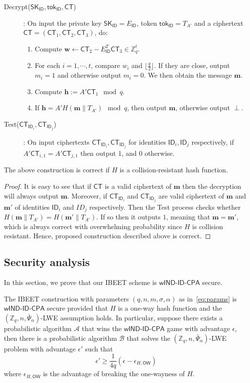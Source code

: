 \documentclass[runningheads]{llncs}
\def\ZZ{\mathbb{Z}}
\def\cal{\mathcal}
\def\bf{\mathbf}
\def\SK{\mathsf{SK}}
\def\tok{\mathsf{tok}}
\def\CT{\mathsf{CT}}
\def\wIND{\textsf{wIND-ID-CPA}}
\def\a{\alpha}
\def\ID{\mathsf{ID}}
\begin{document}
\begin{description}
		\item[Decrypt($\SK_\ID,\tok_\ID,\CT$)]: On input the private key $\SK_\ID=E_\ID$, token $\tok_\ID=T_{A'}$ and a ciphertext $\CT=(\CT_1,\CT_2,\CT_3)$, do:
		\begin{enumerate}
			\item Compute $\bf{w}\gets\CT_2-E_\ID^T\CT_3\in\ZZ_q^t$.
			\item For each $i=1,\cdots, t$, compare $w_i$ and $\lfloor\frac{q}{2}\rfloor$. If they are close, output $m_i=1$ and otherwise output $m_i=0$. We then obtain the message $\bf{m}$. 
			\item Compute $\bf{h}:=A'\CT_1\mod q$.
			\item If $\bf{h}=A'H(\bf{m}\|T_{A'})\mod q$, then output $\bf{m}$, otherwise output $\perp$.
		\end{enumerate}
		\item[Test($\CT_{\ID_i},\CT_{\ID_j}$)]: On input ciphertexts $\CT_{\ID_i},\CT_{\ID_j}$ for identities $\ID_i, \ID_j$ respectively, if $A'\CT_{i,1} = A'\CT_{j,1}$ then output 1, and $0$ otherwise.
	\end{description}
	
	
	\begin{theorem}\label{thm:correctness weak}
		The above construction is correct if $H$  is a collision-resistant hash function.
	\end{theorem}
\begin{proof}
	It is easy to see that if $\CT$ is a valid ciphertext of $\bf{m}$ then the decryption will always output $\bf{m}$. Moreover, if $\CT_{\ID_i}$ and $\CT_{\ID_j}$ are valid ciphertext of $\bf{m}$ and $\bf{m}'$ of identities $\ID_i$ and $ID_j$ respectively. Then the Test process checks whether $H(\bf{m}\|T_{A'})=H(\bf{m}'\|T_{A'})$. If so then it outputs $1$, meaning that $\bf{m}=\bf{m}'$, which is always correct with overwhelming probability since $H$ is collision resistant. Hence, proposed construction described above is correct.
\end{proof}

\subsection{Security analysis}
In this section, we prove that our IBEET scheme is $\wIND$ secure.
\begin{theorem}\label{thm: wIND}
	The IBEET construction with parameters $(q,n,m,\sigma,\alpha)$ as in~\eqref{eq:params}  is $\wIND$ secure provided that $H$ is a one-way hash function and the $(\ZZ_q,n,\bar\Psi_\a)$-LWE assumption holds. In particular, suppose there exists a probabilistic algorithm $\cal{A}$ that wins the $\wIND$ game with advantage $\epsilon$, then there is a probabilistic algorithm $\cal{B}$ that solves the $(\ZZ_q,n,\bar\Psi_\a)$-LWE problem with advantage $\epsilon'$ such that
	$$\epsilon'\geq \frac{1}{4q}\left(\epsilon-\epsilon_{H,\mathsf{OW}}\right)$$
	where $\epsilon_{H,\mathsf{OW}}$ is the advantage of breaking the one-wayness of $H$.
\end{theorem}
\end{document}
